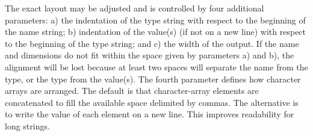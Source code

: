 \documentclass[11pt,nolof]{starlink}
\begin{document}
{{      The exact layout may be adjusted and is controlled by four
      additional parameters: a) the indentation of the type string with
      respect to the beginning of the name string; b) indentation of the
      value(s) (if not on a new line) with respect to the beginning of
      the type string; and c) the width of the output.  If
      the name and dimensions do not fit within the space given by
      parameters a) and b), the alignment will be lost because at least
      two spaces will separate the name from the type, or the type from
      the value(s).  The fourth parameter defines how character arrays
      are arranged.  The default is that character-array elements are
      concatenated to fill the available space delimited by commas.  The
      alternative is to write the value of each element on a new line.
      This improves readability for long strings.
   }
   }
\end{document}
